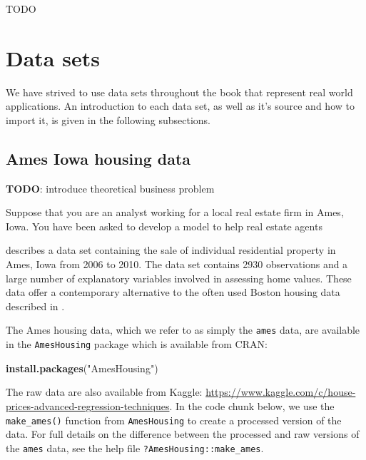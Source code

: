 \documentclass[]{book}
\newenvironment{Shaded}{\begin{snugshade}}{\end{snugshade}}
\newcommand{\KeywordTok}[1]{\textcolor[rgb]{0.13,0.29,0.53}{\textbf{#1}}}
\newcommand{\NormalTok}[1]{#1}
\newcommand{\StringTok}[1]{\textcolor[rgb]{0.31,0.60,0.02}{#1}}
\theoremstyle{definition}
\theoremstyle{definition}
\theoremstyle{definition}
\theoremstyle{remark}
\begin{document}
TODO

\hypertarget{data}{%
\section{Data sets}\label{data}}

We have strived to use data sets throughout the book that represent real
world applications. An introduction to each data set, as well as it's
source and how to import it, is given in the following subsections.

\hypertarget{ames-iowa-housing-data}{%
\subsection*{Ames Iowa housing data}\label{ames-iowa-housing-data}}

\textbf{TODO}: introduce theoretical business problem

Suppose that you are an analyst working for a local real estate firm in
Ames, Iowa. You have been asked to develop a model to help real estate
agents

\citet{ames-cock-2011} describes a data set containing the sale of
individual residential property in Ames, Iowa from 2006 to 2010. The
data set contains 2930 observations and a large number of explanatory
variables involved in assessing home values. These data offer a
contemporary alternative to the often used Boston housing data described
in \citet{harrison1978hedonic}.

The Ames housing data, which we refer to as simply the \texttt{ames}
data, are available in the \texttt{AmesHousing} package
\citep{pkg-AmesHousing} which is available from CRAN:

\begin{Shaded}
\begin{Highlighting}[]
\KeywordTok{install.packages}\NormalTok{(}\StringTok{"AmesHousing"}\NormalTok{)}
\end{Highlighting}
\end{Shaded}

The raw data are also available from Kaggle:
\url{https://www.kaggle.com/c/house-prices-advanced-regression-techniques}.
In the code chunk below, we use the \texttt{make\_ames()} function from
\texttt{AmesHousing} to create a processed version of the data. For full
details on the difference between the processed and raw versions of the
\texttt{ames} data, see the help file \texttt{?AmesHousing::make\_ames}.
\end{document}

